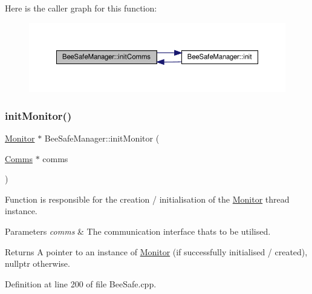 Here is the caller graph for this function\+:\nopagebreak
\begin{figure}[H]
\begin{center}
\leavevmode
\includegraphics[width=350pt]{d5/d75/class_bee_safe_manager_a28306d7ccf7136a6086d666f4ebb6566_icgraph}
\end{center}
\end{figure}
\mbox{\label{class_bee_safe_manager_ad30babe45ead2cb6a5b0559afa5bc5ff}} 
\subsubsection{\texorpdfstring{init\+Monitor()}{initMonitor()}}
{\footnotesize\ttfamily \hyperlink{class_monitor}{Monitor} $\ast$ Bee\+Safe\+Manager\+::init\+Monitor (\begin{DoxyParamCaption}\item[{\hyperlink{class_comms}{Comms} $\ast$}]{comms }\end{DoxyParamCaption})\hspace{0.3cm}{\ttfamily [private]}}

Function is responsible for the creation / initialisation of the \hyperlink{class_monitor}{Monitor} thread instance.


\begin{DoxyParams}{Parameters}
{\em comms} & The communication interface that\textquotesingle{}s to be utilised. \\
\hline
\end{DoxyParams}
\begin{DoxyReturn}{Returns}
A pointer to an instance of \hyperlink{class_monitor}{Monitor} (if successfully initialised / created), nullptr otherwise. 
\end{DoxyReturn}


Definition at line 200 of file Bee\+Safe.\+cpp.



